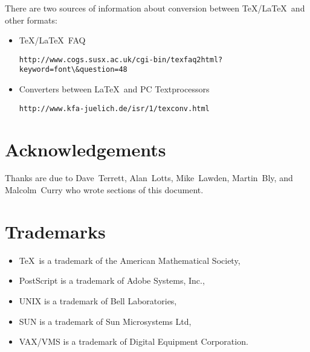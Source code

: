 \documentclass[11pt,twoside]{article}
\newcommand{\htmladdnormallink}[2]{#1}
\newenvironment{latexonly}{}{}
\newcommand{\xlabel}[1]{}
\begin{document}
There are two sources of information about conversion between \TeX/\LaTeX\ and 
other formats:

\begin{itemize}
  \item \htmladdnormallink{\TeX/\LaTeX\ FAQ}
    {http://www.cogs.susx.ac.uk/cgi-bin/texfaq2html?keyword=font&question=48}
    \begin{latexonly}
      \begin{verbatim}
http://www.cogs.susx.ac.uk/cgi-bin/texfaq2html?keyword=font\&question=48
      \end{verbatim}
    \end{latexonly}
  \item \htmladdnormallink{Converters between \LaTeX\ and PC Textprocessors}
    {http://www.kfa-juelich.de/isr/1/texconv.html}
    \begin{latexonly}
      \begin{verbatim}
http://www.kfa-juelich.de/isr/1/texconv.html
      \end{verbatim}
    \end{latexonly}
\end{itemize}


\section{\xlabel{acknowledgements}\label{acknowledgements}Acknowledgements}

Thanks are due to Dave~Terrett, Alan~Lotts, Mike~Lawden, Martin~Bly,  
and Malcolm~Curry who wrote sections of this document. 

\section{\xlabel{trademarks}\label{trademarks}Trademarks}
\begin{itemize}
\item \TeX\ is a trademark of the American Mathematical Society,
\item PostScript is a trademark of Adobe Systems, Inc.,
\item UNIX is a trademark of Bell Laboratories,
\item SUN is a trademark of Sun Microsystems Ltd,
\item VAX/VMS is a trademark of Digital Equipment Corporation.
\end{itemize}

\newpage
{}~

\typeout{}
\typeout{}
\typeout{}
\typeout{}
\end{document}
